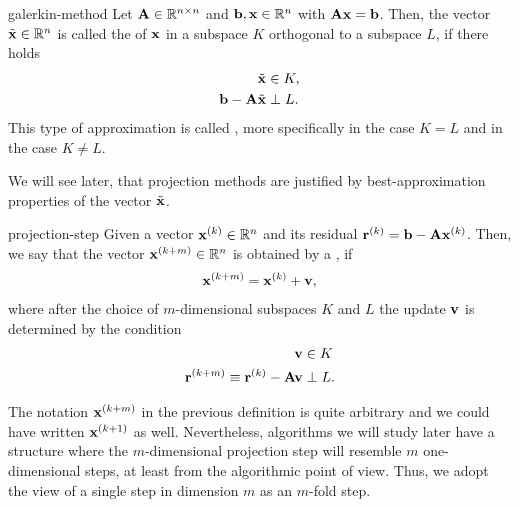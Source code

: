 \begin{Definition}{galerkin-method}
  Let $\mathbf A\in\mathbb R^{n\times n}$ and $\mathbf b, \mathbf x\in\mathbb R^n$ with $\mathbf A\mathbf x=\mathbf b$. Then,
  the vector $\tilde{\mathbf x}\in\mathbb R^n$ is called the  of $\mathbf x$ in a subspace $K$ orthogonal to a subspace
  $L$, if there holds
  \begin{align}
    \tilde{\mathbf x} &\in K,\\
    \mathbf b-\mathbf A\tilde{\mathbf x} &\perp L.
                         \label{eq:proj-it:1}
  \end{align}
  This type of approximation is called , more
  specifically  in the case $K=L$ and
   in the case $K\neq L$.
\end{Definition}

\begin{remark}
  We will see later, that projection methods are justified by
  best-approximation properties of the vector $\tilde {\mathbf x}$.
\end{remark}

\begin{Definition}{projection-step}
  Given a vector $\mathbf x^{(k)}\in\mathbb R^n$ and its residual
  $\mathbf r^{(k)}=\mathbf b-\mathbf A\mathbf x^{(k)}$. Then, we say that the vector
  $\mathbf x^{(k+m)}\in\mathbb R^n$ is obtained by a , if
  \begin{gather}
    \mathbf x^{(k+m)} = \mathbf x^{(k)} + \mathbf v,
  \end{gather}
  where after the choice of $m$-dimensional subspaces $K$ and $L$ the update $\mathbf v$ is
  determined by the condition
  \begin{align}
    \mathbf v &\in K\\
    \mathbf r^{(k+m)} \equiv \mathbf r^{(k)} - \mathbf A\mathbf v &\perp L.
  \end{align}
\end{Definition}

\begin{remark}
  The notation $\mathbf x^{(k+m)}$ in the previous definition is quite
  arbitrary and we could have written $\mathbf x^{(k+1)}$ as
  well. Nevertheless, algorithms we will study later have a structure
  where the $m$-dimensional projection step will resemble $m$
  one-dimensional steps, at least from the algorithmic point of
  view. Thus, we adopt the view of a single step in dimension $m$ as
  an $m$-fold step.
\end{remark}

